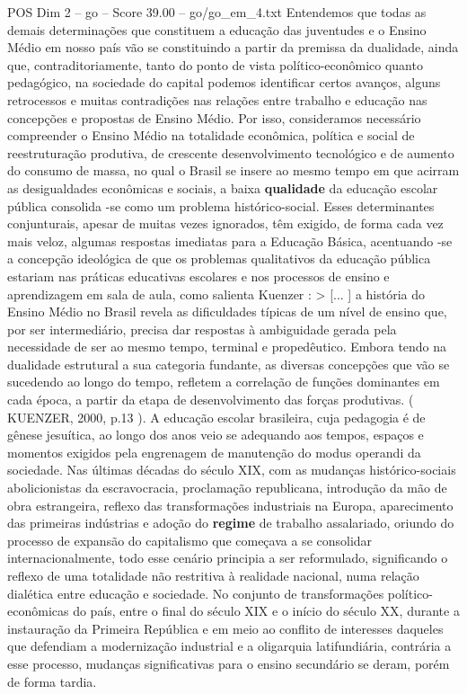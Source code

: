 \begin{textsample}{POS Dim 2 – go – Score 39.00 – go/go\_em\_4.txt}
Entendemos que todas as demais determinações que constituem a educação das juventudes e o Ensino Médio em nosso país vão se constituindo a partir da premissa da dualidade, ainda que, contraditoriamente, tanto do ponto de vista político-econômico quanto pedagógico, na sociedade do capital podemos identificar certos avanços, alguns retrocessos e muitas contradições nas relações entre trabalho e educação nas concepções e propostas de Ensino Médio.
Por isso, consideramos necessário compreender o Ensino Médio na totalidade econômica, política e social de reestruturação produtiva, de crescente desenvolvimento tecnológico e de aumento do consumo de massa, no qual o Brasil se insere ao mesmo tempo em que acirram as desigualdades econômicas e sociais, a baixa \textbf{qualidade} da educação escolar pública consolida -se como um problema histórico-social.
Esses determinantes conjunturais, apesar de muitas vezes ignorados, têm exigido, de forma cada vez mais veloz, algumas respostas imediatas para a Educação Básica, acentuando -se a concepção ideológica de que os problemas qualitativos da educação pública estariam nas práticas educativas escolares e nos processos de ensino e aprendizagem em sala de aula, como salienta Kuenzer : > [... ] a história do Ensino Médio no Brasil revela as dificuldades típicas de um nível de ensino que, por ser intermediário, precisa dar respostas à ambiguidade gerada pela necessidade de ser ao mesmo tempo, terminal e propedêutico.
Embora tendo na dualidade estrutural a sua categoria fundante, as diversas concepções que vão se sucedendo ao longo do tempo, refletem a correlação de funções dominantes em cada época, a partir da etapa de desenvolvimento das forças produtivas. ( KUENZER, 2000, p.13 ).
A educação escolar brasileira, cuja pedagogia é de gênese jesuítica, ao longo dos anos veio se adequando aos tempos, espaços e momentos exigidos pela engrenagem de manutenção do modus operandi da sociedade.
Nas últimas décadas do século XIX, com as mudanças histórico-sociais abolicionistas da escravocracia, proclamação republicana, introdução da mão de obra estrangeira, reflexo das transformações industriais na Europa, aparecimento das primeiras indústrias e adoção do \textbf{regime} de trabalho assalariado, oriundo do processo de expansão do capitalismo que começava a se consolidar internacionalmente, todo esse cenário principia a ser reformulado, significando o reflexo de uma totalidade não restritiva à realidade nacional, numa relação dialética entre educação e sociedade.
No conjunto de transformações político-econômicas do país, entre o final do século XIX e o início do século XX, durante a instauração da Primeira República e em meio ao conflito de interesses daqueles que defendiam a modernização industrial e a oligarquia latifundiária, contrária a esse processo, mudanças significativas para o ensino secundário se deram, porém de forma tardia.

\end{textsample}
